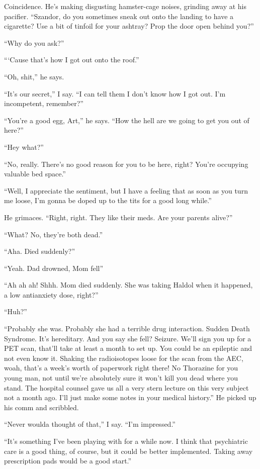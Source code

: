 Coincidence. He’s making disgusting hamster-cage noises, grinding
away at his pacifier. “Szandor, do you sometimes sneak out onto the
landing to have a cigarette? Use a bit of tinfoil for your ashtray?
Prop the door open behind you?”

“Why do you ask?”

“‘Cause that’s how I got out onto the roof.”

“Oh, shit,” he says.

“It’s our secret,” I say. “I can tell them I don’t know how I got
out. I’m incompetent, remember?”

“You’re a good egg, Art,” he says. “How the hell are we going to
get you out of here?”

“Hey what?”

“No, really. There’s no good reason for you to be here, right?
You’re occupying valuable bed space.”

“Well, I appreciate the sentiment, but I have a feeling that as
soon as you turn me loose, I’m gonna be doped up to the tits for a
good long while.”

He grimaces. “Right, right. They like their meds. Are your parents
alive?”

“What? No, they’re both dead.”

“Aha. Died suddenly?”

“Yeah. Dad drowned, Mom fell{\dash}”

“Ah ah ah! Shhh. Mom died suddenly. She was taking Haldol when it
happened, a low antianxiety dose, right?”

“Huh?”

“Probably she was. Probably she had a terrible drug interaction.
Sudden Death Syndrome. It’s hereditary. And you say she fell?
Seizure. We’ll sign you up for a PET scan, that’ll take at least a
month to set up. You could be an epileptic and not even know it.
Shaking the radioisotopes loose for the scan from the AEC, woah,
that’s a week’s worth of paperwork right there! No Thorazine for
you young man, not until we’re absolutely sure it won’t kill you
dead where you stand. The hospital counsel gave us all a very stern
lecture on this very subject not a month ago. I’ll just make some
notes in your medical history.” He picked up his comm and
scribbled.

“Never woulda thought of that,” I say. “I’m impressed.”

“It’s something I’ve been playing with for a while now. I think
that psychiatric care is a good thing, of course, but it could be
better implemented. Taking away prescription pads would be a good
start.”

